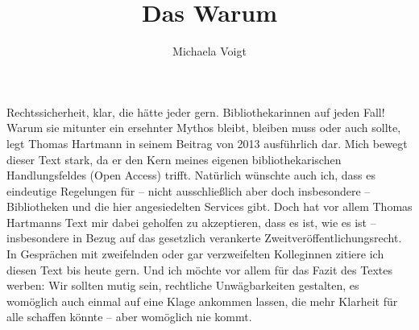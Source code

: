 \documentclass[output=paper]{langsci/langscibook}
\title{Das Warum}
\author{Michaela Voigt}
\begin{document}
\maketitle

\noindent Rechtssicherheit, klar, die hätte jede\*r gern. Bibliothekar\*innen auf jeden Fall! Warum sie mitunter ein ersehnter Mythos bleibt, bleiben muss oder auch sollte, legt Thomas Hartmann in seinem Beitrag von 2013 ausführlich dar. Mich bewegt dieser Text stark, da er den Kern meines eigenen bibliothekarischen Handlungsfeldes (Open Access) trifft. Natürlich wünschte auch ich, dass es eindeutige Regelungen für -- nicht ausschließlich aber doch insbesondere -- Bibliotheken und die hier angesiedelten Services gibt. Doch hat vor allem Thomas Hartmanns Text mir dabei geholfen zu akzeptieren, dass es ist, wie es ist -- insbesondere in Bezug auf das gesetzlich verankerte Zweitveröffentlichungsrecht. In Gesprächen mit zweifelnden oder gar verzweifelten Kolleg\*innen zitiere ich diesen Text bis heute gern. Und ich möchte vor allem für das Fazit des Textes werben: Wir sollten mutig sein, rechtliche Unwägbarkeiten gestalten, es womöglich auch einmal auf eine Klage ankommen lassen, die mehr Klarheit für alle schaffen könnte -- aber womöglich nie kommt.
\end{document}
